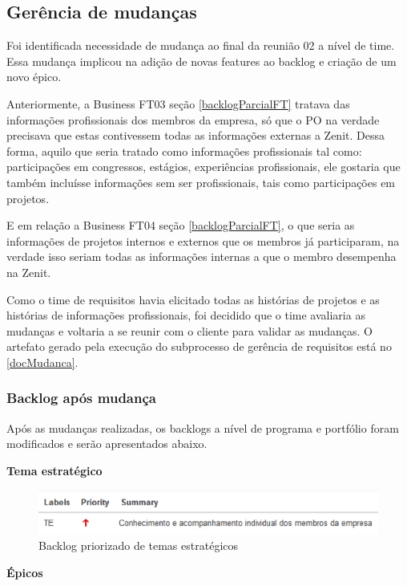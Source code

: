 \subsection{Gerência de mudanças}

 Foi identificada necessidade de mudança ao final da reunião 02 a nível de time. Essa mudança implicou na adição de novas features ao backlog e criação de um novo épico.

 Anteriormente, a Business FT03 seção \ref{backlogParcialFT} tratava das informações profissionais dos membros da empresa, só que o PO na verdade precisava que estas contivessem todas as informações externas a Zenit. Dessa forma, aquilo que seria tratado como informações profissionais tal como: participações em congressos, estágios, experiências profissionais, ele gostaria que também incluísse informações sem ser profissionais, tais como participações em projetos.
 
 E em relação a Business FT04 seção \ref{backlogParcialFT}, o que seria as informações de projetos internos e externos que os membros já participaram, na verdade isso seriam todas as informações internas a que o membro desempenha na Zenit.
 
 Como o time de requisitos havia elicitado todas as histórias de projetos e as histórias de informações profissionais, foi decidido que o time avaliaria as mudanças e voltaria a se reunir com o cliente para validar as mudanças. O artefato gerado pela execução do subprocesso de gerência de requisitos está no \autoref{docMudanca}.

\subsubsection{Backlog após mudança}
Após as mudanças realizadas, os backlogs a nível de programa e portfólio foram modificados e serão apresentados abaixo.

\textbf{Tema estratégico}

\begin{figure}[H]
    \centering
    \includegraphics[keepaspectratio=true,scale=0.6]{figuras/blte01.eps}
    \caption[Backlog tema estratégico]{Backlog priorizado de temas estratégicos\label{blte01}}
\end{figure}

\textbf{Épicos}

